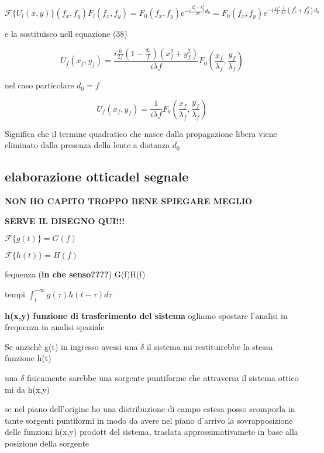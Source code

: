 \documentclass{article}
\begin{document}
$	\mathscr{F} \{	U_{l}(x,y)	\} ( f_{x}, f_{y}) 	F_{l}(f_{x}, f_{y}) = F_{0}(f_{x}, f_{y}) 	e^{		-i \frac{  k_{x}^{2} +  k_{y}^{2}}{2 k}	d_{0}} = F_{0}(f_{x}, f_{y}) 	e^{		-i \frac{ 4 \pi ^{2}}{2}     \frac{\lambda}{ 2 \pi}    (  f_{x}^{2} +  f_{y}^{2})	d_{0}}$

e la sostituisco nell equazione (38) 

\begin{equation}
U_{f}(x_{f}, y_{f}) = \frac{       i \frac{k}{2 f} (     1- \frac{d_{0}}{f}  )(x_{f}^{2}+ y_{f}^{2})               }{i \lambda f} F_{0}(\frac{x_{f}}{\lambda_{f}}, \frac{y_{f}}{\lambda_{f}})
\end{equation}


nel caso particolare $d_{0}=f$

\begin{equation}
U_{f}(x_{f}, y_{f})=\frac{1}{ i \lambda f} F_{0}(\frac{x_{f}}{\lambda_{f}}, \frac{y_{f}}{\lambda_{f}})
\end{equation}

Significa che il termine quadratico che nasce dalla propagazione libera viene eliminato dalla presenza della lente a distanza $d_{0}$




\subsection{elaborazione otticadel segnale}

\textbf{NON HO CAPITO TROPPO BENE SPIEGARE MEGLIO}

\textbf{SERVE IL DISEGNO QUI!!!}



$\mathscr{F} \{ g(t)\}= G(f)$

$\mathscr{F} \{h(t)\}  = H(f)$

fequenza (\textbf{in che senso????})  G(f)H(f)

tempi $     \int_{t}^{-\infty}      g(\tau) h(t- \tau) d\tau         $


 \textbf{h(x,y) funzione di trasferimento del sistema}
ogliamo spostare l'analisi in frequenza in analisi spaziale 

Se anzichè g(t) in ingresso avessi una $\delta $ il sistema mi restituirebbe la stessa funzione h(t) 

una $\delta$ fisicamente sarebbe una sorgente puntiforme che attraversa il sistema ottico mi da h(x,y)

se nel piano dell'origine ho una distribuzione di campo estesa posso scomporla in tante sorgenti puntiformi in modo da avere nel piano d'arrivo la sovrapposizione delle funzioni h(x,y) prodott del sistema, traslata approssimativamete in base alla posizione della sorgente 
\end{document}
